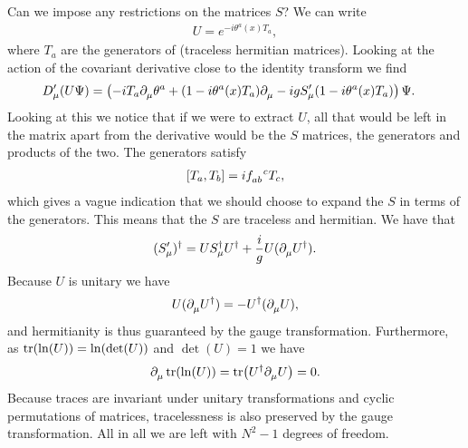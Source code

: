 Can we impose any restrictions on the matrices $S$? We can write
\begin{align*}
U = e^{-i\theta^{a}(x)T_{a}},
\end{align*}
where $T_{a}$ are the generators of  (traceless hermitian matrices). Looking at the action of the covariant derivative close to the identity transform we find
\begin{align*}
D_{\mu}^{\prime}(U\Psi) &= \left(-iT_{a}\partial^{}_{\mu}\theta^{a} + (1 - i\theta^{a}(x)T_{a})\partial^{}_{\mu} - igS_{\mu}^{\prime}(1 - i\theta^{a}(x)T_{a})\right)\Psi.
\end{align*}
Looking at this we notice that if we were to extract $U$, all that would be left in the matrix apart from the derivative would be the $S$ matrices, the generators and products of the two. The generators satisfy
\begin{align*}
\comm{T_{a}}{T_{b}} = i\srconst{ab}{c}T_{c},
\end{align*}
which gives a vague indication that we should choose to expand the $S$ in terms of the generators. This means that the $S$ are traceless and hermitian. We have that
\begin{align*}
(S_{\mu}^{\prime})^{\dagger} = US_{\mu}^{\dagger} U^{\dagger} + \frac{i}{g}U(\partial^{}_{\mu}U^{\dagger}).
\end{align*}
Because $U$ is unitary we have
\begin{align*}
U(\partial^{}_{\mu}U^{\dagger}) = -U^{\dagger}(\partial^{}_{\mu}U),
\end{align*}
and hermitianity is thus guaranteed by the gauge transformation. Furthermore, as $\tr(\ln(U)) = \ln(\det(U))$ and $\det(U) = 1$ we have
\begin{align*}
\partial^{}_{\mu}\tr(\ln(U)) = \tr(U^{\dagger}\partial^{}_{\mu}U) = 0.
\end{align*}
Because traces are invariant under unitary transformations and cyclic permutations of matrices, tracelessness is also preserved by the gauge transformation. All in all we are left with $N^{2} - 1$ degrees of freedom.

